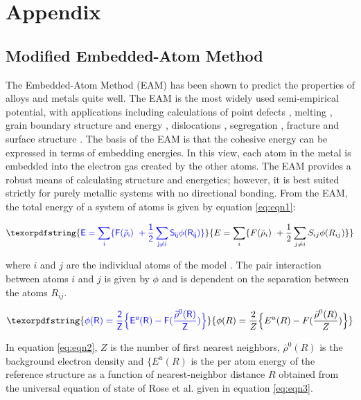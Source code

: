 \documentclass[review]{elsarticle}
\providecommand{\DIFaddtex}[1]{{\protect\color{blue} \sf #1}} %
\providecommand{\DIFadd}[1]{\texorpdfstring{\DIFaddtex{#1}}{#1}} %
\begin{document}
\section{\DIFadd{Appendix}}

\subsection{\DIFadd{Modified Embedded-Atom Method}}
\DIFadd{The Embedded-Atom Method (EAM) \cite{daw1984, daw1993, daw1983} has been shown to predict the properties of alloys and metals quite well. The EAM is the most widely used semi-empirical potential, with applications including calculations of point defects \cite{olsson2009}, melting \cite{belaschenko2011}, grain boundary structure and energy \cite{liu1999}, dislocations \cite{chassange2011}, segregation \cite{li2009MatChem}, fracture \cite{vatne2011} and surface structure \cite{rose1984}.  The basis of the EAM is that the cohesive energy can be expressed in terms of embedding energies.  In this view, each atom in the metal is embedded into the electron gas created by the other atoms.  The EAM provides a robust means of calculating structure and energetics; however, it is best suited strictly for purely metallic systems with no directional bonding.
From the EAM, the total energy of a system of atoms is given by equation \ref{eq:eqn1}:
}


\begin{equation}
\DIFadd{\label{eq:eqn1}
E = \sum_{i} \{F(\bar{\rho}_{i})\ +  \frac{1}{2} \sum_{j \neq i} S_{ij}\phi(R_{ij})   \}
}\end{equation}

\DIFadd{where $i$ and $j$ are the individual atoms of the model \cite{daw1983, daw1984}.  The pair interaction between atoms $i$ and $j$ is given by $\phi$ \cite{baskes1992} and is dependent on the separation between the atoms $R_{ij}$.
}

\begin{equation}
\DIFadd{\label{eq:eqn2}
\phi(R) = \frac{2}{Z} \Bigl\{ E^{u}(R) - F( \frac{ \bar{ \rho}^{0}(R)}{Z}) \Bigr\}  
}\end{equation}

\DIFadd{In equation \ref{eq:eqn2}, $Z$ is the number of first nearest neighbors, $\bar{ \rho}^{0}(R)$ is the background electron density and $\{E^{u}(R)$ is the per atom energy of the reference structure as a function of nearest-neighbor distance $R$ \cite{baskes2000} obtained from the universal equation of state of Rose et al. \cite{rose1984} given in equation \ref{eq:eqn3}.
}
\end{document}
